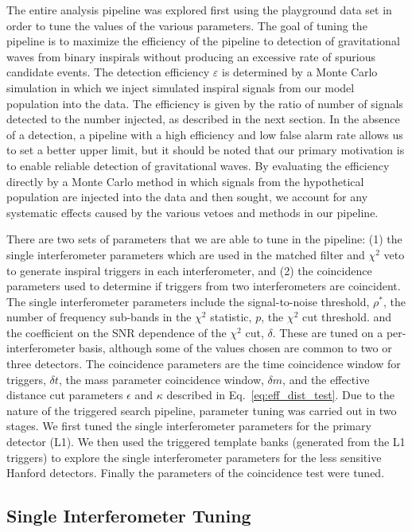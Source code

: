 The entire analysis pipeline was explored first using the playground data set
in order to tune the values of the various parameters. The goal of tuning the
pipeline is to maximize the efficiency of the pipeline to detection of
gravitational waves from binary inspirals without producing an excessive rate
of spurious candidate events.  The detection efficiency $\varepsilon$ is
determined by a Monte Carlo simulation in which we inject simulated inspiral
signals from our model population into the data. The efficiency is given by
the ratio of number of signals detected to the number injected, as described
in the next section.  In the absence of a detection, a pipeline with a high
efficiency and low false alarm rate allows us to set a better upper limit, but
it should be noted that our primary motivation is to enable reliable detection
of gravitational waves. By evaluating the efficiency directly by a Monte Carlo
method in which signals from the hypothetical population are injected into the
data and then sought, we account for any systematic effects caused by the
various vetoes and methods in our pipeline.

There are two sets of parameters that we are able to tune in the pipeline: (1)
the single interferometer parameters which are used in the matched filter and
$\chi^2$ veto to generate inspiral triggers in each interferometer, and (2)
the coincidence parameters used to determine if triggers from two
interferometers are coincident. The single interferometer parameters include
the signal-to-noise threshold, $\rho^\ast$, the number of frequency sub-bands
in the $\chi^2$ statistic, $p$, the $\chi^2$ cut threshold.
and the coefficient on the SNR dependence of the $\chi^2$ cut, $\delta$. These
are tuned on a per-interferometer basis, although some of the values chosen
are common to two or three detectors.  The coincidence parameters are the time
coincidence window for triggers, $\delta t$, the mass parameter coincidence
window, $\delta m$, and the effective distance cut parameters $\epsilon$ and
$\kappa$ described in Eq.~\ref{eq:eff_dist_test}.  Due to the nature of the
triggered search pipeline, parameter tuning was carried out in two stages. We
first tuned the single interferometer parameters for the primary detector
(L1).  We then used the triggered template banks (generated from the L1
triggers) to explore the single interferometer parameters for the less
sensitive Hanford detectors. Finally the parameters of the coincidence test
were tuned.

\subsection{Single Interferometer Tuning}
\label{ss:single_ifo_tuning}

